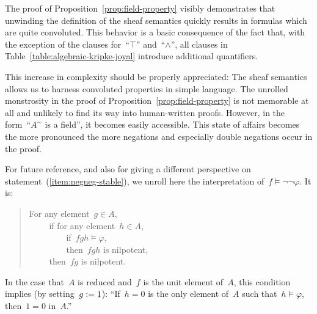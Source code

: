 \documentclass{ws-rv9x6}
\begin{document}
{The proof of Proposition~\ref{prop:field-property} visibly demonstrates that
unwinding the definition of the sheaf semantics quickly results in formulas
which are quite convoluted. This behavior is a basic consequence of the fact
that, with the exception of the clauses for~``$\top$'' and~``$\wedge$'', all
clauses in Table~\ref{table:algebraic-kripke-joyal} introduce additional
quantifiers.

This increase in complexity should be properly appreciated: The sheaf semantics
allows us to harness convoluted properties in simple language. The unrolled
monstrosity in the proof of Proposition~\ref{prop:field-property} is not
memorable at all and unlikely to find its way into human-written proofs.
However, in the form~``$A^\sim$ is a field'', it becomes easily accessible.
This state of affairs becomes the more pronounced the more negations and especially
double negations occur in the proof.


\begin{example}\label{ex:negneg-interpretation}
For future reference, and also for giving a different
perspective on statement~(\ref{item:negneg-stable}), we unroll here the
interpretation of~$f \models \neg\neg\varphi$. It is:
\begin{quote}
For any element~$g \in A$, \\
${\qquad}$ if for any element~$h \in A$, \\
${\qquad\qquad}$ if~$fgh \models \varphi$, \\
${\qquad\qquad}$ then~$fgh$ is nilpotent, \\
${\qquad}$ then~$fg$ is nilpotent.
\end{quote}
In the case that~$A$ is reduced and~$f$ is the unit element of~$A$, this
condition implies (by setting~$g \vcentcolon= 1$): ``If~$h = 0$ is the only element of~$A$
such that~$h \models \varphi$, then~$1 = 0$ in~$A$.''
\end{example}

}
\end{document}
